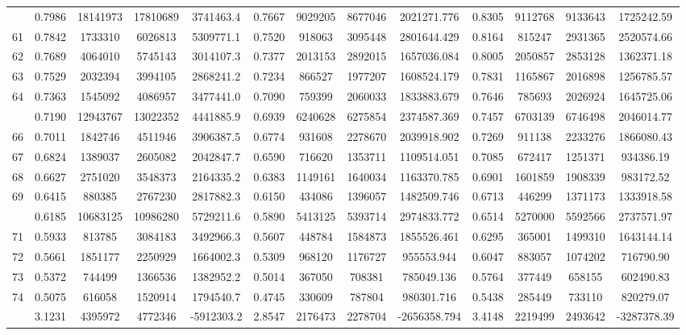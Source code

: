 \documentclass[
  12pt,
]{article}
\begin{document}
\begin{longtable}[t]{lcccccccccccc}
\addlinespace
60 & 0.7986 & 18141973 & 17810689 & 3741463.4 & 0.7667 & 9029205 & 8677046 & 2021271.776 & 0.8305 & 9112768 & 9133643 & 1725242.59\\
61 & 0.7842 & 1733310 & 6026813 & 5309771.1 & 0.7520 & 918063 & 3095448 & 2801644.429 & 0.8164 & 815247 & 2931365 & 2520574.66\\
62 & 0.7689 & 4064010 & 5745143 & 3014107.3 & 0.7377 & 2013153 & 2892015 & 1657036.084 & 0.8005 & 2050857 & 2853128 & 1362371.18\\
63 & 0.7529 & 2032394 & 3994105 & 2868241.2 & 0.7234 & 866527 & 1977207 & 1608524.179 & 0.7831 & 1165867 & 2016898 & 1256785.57\\
64 & 0.7363 & 1545092 & 4086957 & 3477441.0 & 0.7090 & 759399 & 2060033 & 1833883.679 & 0.7646 & 785693 & 2026924 & 1645725.06\\
\addlinespace
65 & 0.7190 & 12943767 & 13022352 & 4441885.9 & 0.6939 & 6240628 & 6275854 & 2374587.369 & 0.7457 & 6703139 & 6746498 & 2046014.77\\
66 & 0.7011 & 1842746 & 4511946 & 3906387.5 & 0.6774 & 931608 & 2278670 & 2039918.902 & 0.7269 & 911138 & 2233276 & 1866080.43\\
67 & 0.6824 & 1389037 & 2605082 & 2042847.7 & 0.6590 & 716620 & 1353711 & 1109514.051 & 0.7085 & 672417 & 1251371 & 934386.19\\
68 & 0.6627 & 2751020 & 3548373 & 2164335.2 & 0.6383 & 1149161 & 1640034 & 1163370.785 & 0.6901 & 1601859 & 1908339 & 983172.52\\
69 & 0.6415 & 880385 & 2767230 & 2817882.3 & 0.6150 & 434086 & 1396057 & 1482509.746 & 0.6713 & 446299 & 1371173 & 1333918.58\\
\addlinespace
70 & 0.6185 & 10683125 & 10986280 & 5729211.6 & 0.5890 & 5413125 & 5393714 & 2974833.772 & 0.6514 & 5270000 & 5592566 & 2737571.97\\
71 & 0.5933 & 813785 & 3084183 & 3492966.3 & 0.5607 & 448784 & 1584873 & 1855526.461 & 0.6295 & 365001 & 1499310 & 1643144.14\\
72 & 0.5661 & 1851177 & 2250929 & 1664002.3 & 0.5309 & 968120 & 1176727 & 955553.944 & 0.6047 & 883057 & 1074202 & 716790.90\\
73 & 0.5372 & 744499 & 1366536 & 1382952.2 & 0.5014 & 367050 & 708381 & 785049.136 & 0.5764 & 377449 & 658155 & 602490.83\\
74 & 0.5075 & 616058 & 1520914 & 1794540.7 & 0.4745 & 330609 & 787804 & 980301.716 & 0.5438 & 285449 & 733110 & 820279.07\\
\addlinespace
75 & 3.1231 & 4395972 & 4772346 & -5912303.2 & 2.8547 & 2176473 & 2278704 & -2656358.794 & 3.4148 & 2219499 & 2493642 & -3287378.39\\*
\end{longtable}
\endgroup{}
\end{document}
